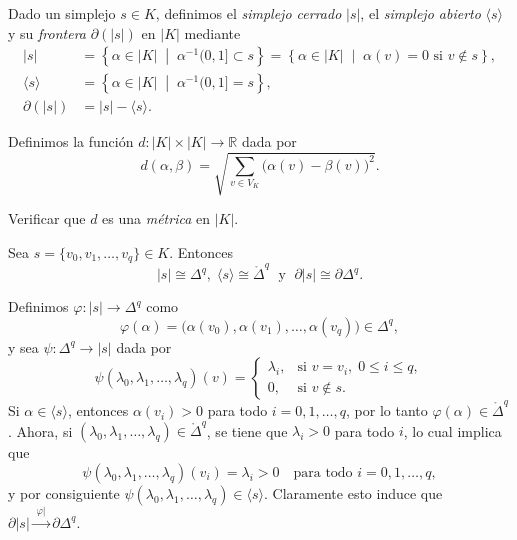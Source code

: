 \begin{definicion}
Dado un simplejo $s \in K$, definimos el \textit{simplejo cerrado} $|s|$, el \textit{simplejo abierto} $\langle s \rangle$ y su \textit{frontera} $\partial(|s|)$ en $|K|$ mediante
\begin{align*}
|s| &= \left\{ \alpha \in |K| \;\middle|\; \alpha^{-1}(0, 1] \subset s \right\} = \left\{ \alpha \in |K| \;\middle|\; \alpha(v) = 0 \text{ si } v \notin s \right\}, \\[1ex]
\langle s \rangle &= \left\{ \alpha \in |K| \;\middle|\; \alpha^{-1}(0, 1] = s \right\}, \\[1ex]
\partial(|s|) &= |s| - \langle s \rangle.
\end{align*}
\end{definicion}

\begin{definicion}
Definimos la función $d \colon |K| \times |K| \to \mathbb{R}$ dada por
\[
d(\alpha, \beta) = \sqrt{\sum_{v \in V_K} \big(\alpha(v) - \beta(v)\big)^2}.
\]
\end{definicion}

\begin{ejercicio}
Verificar que $d$ es una \textit{métrica} en $|K|$.
\end{ejercicio}
\begin{lema}
Sea $s = \{v_0, v_1, \dots, v_q\} \in K$. Entonces
\[
|s| \cong \Delta^q, \; \langle s \rangle \cong \mathring{\Delta}^q \; \text{ y } \; \partial|s| \cong \partial\Delta^q.
\]
\end{lema}

\begin{dem}
Definimos $\varphi \colon |s| \to \Delta^q$ como
\[
\varphi(\alpha) = \big(\alpha(v_0), \alpha(v_1), \dots, \alpha(v_q)\big) \in \Delta^q,
\]
y sea $\psi \colon \Delta^q \to |s|$ dada por
\[
\psi(\lambda_0, \lambda_1, \dots, \lambda_q)(v) = 
\begin{cases}
    \lambda_i, & \text{si } v = v_i, \; 0 \leq i \leq q, \\
    0, & \text{si } v \notin s.
\end{cases}
\]
Si $\alpha \in \langle s \rangle$, entonces $\alpha(v_i) > 0$ para todo $i = 0, 1, \dots, q$, por lo tanto $\varphi(\alpha) \in \mathring{\Delta}^q$. Ahora, si $(\lambda_0, \lambda_1, \dots, \lambda_q) \in \mathring{\Delta}^q$, se tiene que $\lambda_i > 0$ para todo $i$, lo cual implica que
\[
\psi(\lambda_0, \lambda_1, \dots, \lambda_q)(v_i) = \lambda_i > 0 \quad \text{para todo } i = 0, 1, \dots, q,
\]
y por consiguiente $\psi(\lambda_0, \lambda_1, \dots, \lambda_q) \in \langle s \rangle$. Claramente esto induce que $\partial|s| \xrightarrow{\;\varphi|\;} \partial\Delta^q$.
\end{dem}

